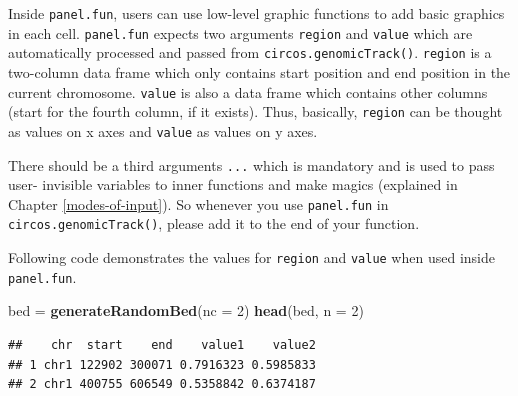 \documentclass[]{book}
\newenvironment{Shaded}{\begin{snugshade}}{\end{snugshade}}
\newcommand{\KeywordTok}[1]{\textcolor[rgb]{0.13,0.29,0.53}{\textbf{#1}}}
\newcommand{\DataTypeTok}[1]{\textcolor[rgb]{0.13,0.29,0.53}{#1}}
\newcommand{\DecValTok}[1]{\textcolor[rgb]{0.00,0.00,0.81}{#1}}
\newcommand{\StringTok}[1]{\textcolor[rgb]{0.31,0.60,0.02}{#1}}
\newcommand{\OtherTok}[1]{\textcolor[rgb]{0.56,0.35,0.01}{#1}}
\newcommand{\ControlFlowTok}[1]{\textcolor[rgb]{0.13,0.29,0.53}{\textbf{#1}}}
\newcommand{\OperatorTok}[1]{\textcolor[rgb]{0.81,0.36,0.00}{\textbf{#1}}}
\newcommand{\NormalTok}[1]{#1}
\begin{document}
Inside \texttt{panel.fun}, users can use low-level graphic functions to
add basic graphics in each cell. \texttt{panel.fun} expects two
arguments \texttt{region} and \texttt{value} which are automatically
processed and passed from \texttt{circos.genomicTrack()}.
\texttt{region} is a two-column data frame which only contains start
position and end position in the current chromosome. \texttt{value} is
also a data frame which contains other columns (start for the fourth
column, if it exists). Thus, basically, \texttt{region} can be thought
as values on x axes and \texttt{value} as values on y axes.

There should be a third arguments \texttt{...} which is mandatory and is
used to pass user- invisible variables to inner functions and make
magics (explained in Chapter \ref{modes-of-input}). So whenever you use
\texttt{panel.fun} in \texttt{circos.genomicTrack()}, please add it to
the end of your function.

Following code demonstrates the values for \texttt{region} and
\texttt{value} when used inside \texttt{panel.fun}.

\begin{Shaded}
\begin{Highlighting}[]
\NormalTok{bed =}\StringTok{ }\KeywordTok{generateRandomBed}\NormalTok{(}\DataTypeTok{nc =} \DecValTok{2}\NormalTok{)}
\KeywordTok{head}\NormalTok{(bed, }\DataTypeTok{n =} \DecValTok{2}\NormalTok{)}
\end{Highlighting}
\end{Shaded}

\begin{verbatim}
##    chr  start    end    value1    value2
## 1 chr1 122902 300071 0.7916323 0.5985833
## 2 chr1 400755 606549 0.5358842 0.6374187
\end{verbatim}

\begin{Shaded}
\end{Shaded}
\end{document}
